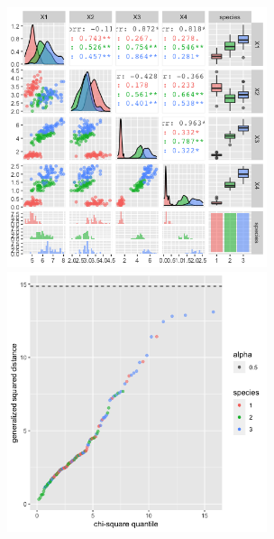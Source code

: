 \begin{center}
	\includegraphics[width=3.0in]{II_matrix.png}
	\includegraphics[width=3.0in]{II_chisq.png}
\end{center}

